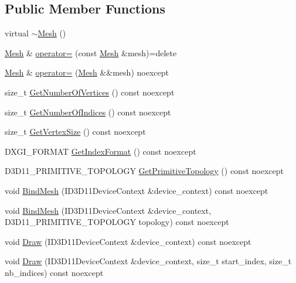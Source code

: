 \subsection*{Public Member Functions}
\begin{DoxyCompactItemize}
\item 
virtual \hyperlink{classmage_1_1rendering_1_1_mesh_a3f0a53becc293987d7ecf9ca34a230d8}{$\sim$\+Mesh} ()
\item 
\hyperlink{classmage_1_1rendering_1_1_mesh}{Mesh} \& \hyperlink{classmage_1_1rendering_1_1_mesh_a17f6dd40e8eea41b469b475de93ee466}{operator=} (const \hyperlink{classmage_1_1rendering_1_1_mesh}{Mesh} \&mesh)=delete
\item 
\hyperlink{classmage_1_1rendering_1_1_mesh}{Mesh} \& \hyperlink{classmage_1_1rendering_1_1_mesh_ae5bcea1df4c9562bfe30cd247552fe1c}{operator=} (\hyperlink{classmage_1_1rendering_1_1_mesh}{Mesh} \&\&mesh) noexcept
\item 
size\+\_\+t \hyperlink{classmage_1_1rendering_1_1_mesh_a2c594e3c3b8e09bc20b35845ab46b6f3}{Get\+Number\+Of\+Vertices} () const noexcept
\item 
size\+\_\+t \hyperlink{classmage_1_1rendering_1_1_mesh_aaf8574345279790ca88d8acc5c2c85b6}{Get\+Number\+Of\+Indices} () const noexcept
\item 
size\+\_\+t \hyperlink{classmage_1_1rendering_1_1_mesh_a0fcc1a72aa5426ce9b020b580eb22a43}{Get\+Vertex\+Size} () const noexcept
\item 
D\+X\+G\+I\+\_\+\+F\+O\+R\+M\+AT \hyperlink{classmage_1_1rendering_1_1_mesh_a47540e1d5ec5d278862a3d0c0c5db1df}{Get\+Index\+Format} () const noexcept
\item 
D3\+D11\+\_\+\+P\+R\+I\+M\+I\+T\+I\+V\+E\+\_\+\+T\+O\+P\+O\+L\+O\+GY \hyperlink{classmage_1_1rendering_1_1_mesh_af6cead725f7e5352a90a8f8847580f75}{Get\+Primitive\+Topology} () const noexcept
\item 
void \hyperlink{classmage_1_1rendering_1_1_mesh_a36999cc548e68c3ad0c8d348ad0ead4f}{Bind\+Mesh} (I\+D3\+D11\+Device\+Context \&device\+\_\+context) const noexcept
\item 
void \hyperlink{classmage_1_1rendering_1_1_mesh_a35fe2a8fd609c204c70668e3a0a68331}{Bind\+Mesh} (I\+D3\+D11\+Device\+Context \&device\+\_\+context, D3\+D11\+\_\+\+P\+R\+I\+M\+I\+T\+I\+V\+E\+\_\+\+T\+O\+P\+O\+L\+O\+GY topology) const noexcept
\item 
void \hyperlink{classmage_1_1rendering_1_1_mesh_a4a29089e1894662029be09eafe32255b}{Draw} (I\+D3\+D11\+Device\+Context \&device\+\_\+context) const noexcept
\item 
void \hyperlink{classmage_1_1rendering_1_1_mesh_afc0c89379a7fe1040cf069105ee3520c}{Draw} (I\+D3\+D11\+Device\+Context \&device\+\_\+context, size\+\_\+t start\+\_\+index, size\+\_\+t nb\+\_\+indices) const noexcept
\end{DoxyCompactItemize}
